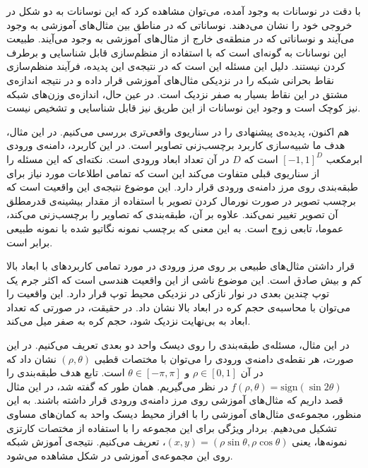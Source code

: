 \documentclass[12pt,onecolumn,a4paper]{article}
\begin{document}
با دقت در نوسانات به وجود آمده، می‌توان مشاهده کرد که این نوسانات به دو شکل در خروجی خود را نشان می‌دهند. نوساناتی که در مناطق بین مثال‌های آموزشی به وجود می‌آیند و نوساناتی که در منطقه‌ی خارج از مثال‌های آموزشی به وجود می‌آیند. طبیعت این نوسانات به گونه‌ای است که با استفاده از منظم‌سازی قابل شناسایی و برطرف کردن نیستند. دلیل این مسئله این است که در نتیجه‌ی این پدیده، فرآیند منظم‌سازی نقاط بحرانی شبکه را در نزدیکی مثال‌های آموزشی قرار داده و در نتیجه اندازه‌ی مشتق در این نقاط بسیار به صفر نزدیک است. در عین حال، اندازه‌ی وزن‌های شبکه نیز کوچک است و وجود این نوسانات از این طریق نیز قابل شناسایی و تشخیص نیست.

هم اکنون، پدیده‌ی پیشنهادی را در سناریوی واقعی‌تری بررسی می‌کنیم. در این مثال، هدف ما شبیه‌سازی کاربرد برچسب‌زنی تصاویر است. در این کاربرد، دامنه‌ی ورودی ابرمکعب $[-1,1]^D$ 
است که $D$ 
در آن تعداد ابعاد ورودی است. نکته‌ای که این مسئله را از سناریوی قبلی متفاوت می‌کند این است که تمامی اطلاعات مورد نیاز برای طبقه‌بندی روی مرز دامنه‌ی ورودی قرار دارد. این موضوع نتیجه‌ی این واقعیت است که برچسب تصویر در صورت نورمال کردن تصویر با استفاده از مقدار بیشینه‌ی قدرمطلق آن تصویر تغییر نمی‌کند. علاوه بر آن، طبقه‌بندی که تصاویر را برچسب‌زنی می‌کند، عموما، تابعی زوج است. به این معنی که برچسب نمونه نگاتیو شده با نمونه طبیعی برابر است.

قرار داشتن مثال‌های طبیعی بر روی مرز ورودی در مورد تمامی کاربردهای با ابعاد بالا کم و بیش صادق است. این موضوع ناشی از این واقعیت هندسی است که اکثر جرم یک توپ چندین بعدی در نوار نازکی در نزدیکی محیط توپ قرار دارد. این واقعیت را می‌توان با محاسبه‌ی حجم کره در ابعاد بالا نشان داد. در حقیقت، در صورتی که تعداد ابعاد به بی‌نهایت نزدیک شود، حجم کره به صفر میل می‌کند.

در این مثال، مسئله‌ی طبقه‌بندی را روی دیسک واحد دو بعدی تعریف می‌کنیم. در این صورت، هر نقطه‌ی دامنه‌ی ورودی را می‌توان با مختصات قطبی $(\rho,\theta)$ 
 نشان داد که در آن $\rho \in [0,1]$ و $\theta \in [-\pi,\pi]$ است. 
 تابع هدف طبقه‌بندی را $f(\rho,\theta)=\mathrm{sign}(\sin 2\theta)$ در نظر می‌گیریم.
همان طور که گفته شد، در این مثال قصد داریم که مثال‌های آموزشی روی مرز دامنه‌ی ورودی قرار داشته باشند. به این منظور، مجموعه‌ی مثال‌های آموزشی را با افراز محیط دیسک واحد به کمان‌های مساوی تشکیل می‌دهیم. بردار ویژگی برای این مجموعه را با استفاده از مختصات کارتزی نمونه‌ها، یعنی $(x,y)=(\rho\sin\theta,\rho\cos\theta)$، تعریف می‌کنیم. نتیجه‌ی آموزش شبکه روی این مجموعه‌ی آموزشی در شکل مشاهده می‌شود.
\end{document}
